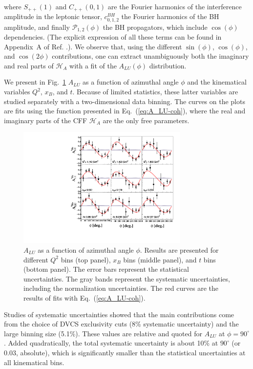 \documentclass[twocolumn,nofootinbib,prl,superscriptaddress,secnumarabic,amssymb,nobibnotes,aps,floatfix]{revtex4}
\begin{document}
where $S_{++}(1)$ and $C_{++}(0,1)$ are the Fourier harmonics of the 
interference amplitude in the leptonic tensor, $c_{0,1,2}^{BH}$ the Fourier 
harmonics of the BH amplitude, and finally ${\mathcal P}_{1,2}(\phi)$ the BH
propagators, which include $\cos(\phi)$ dependencies. (The explicit expression 
of all these terms can be found in Appendix~A of Ref.  
\cite{Armstrong:2017wfw}.). We observe that, using the different $\sin(\phi)$, 
$\cos(\phi)$, and $\cos(2\phi)$ contributions, one can extract unambiguously 
both the imaginary and real parts of $\mathcal{H}_{A}$ with a fit of the 
$A_{LU}(\phi)$ distribution.

We present in Fig.~\ref{fig:alu} $A_{LU}$ as a function of azimuthal angle 
$\phi$ and the kinematical variables $Q^2$, $x_B$, and $t$. Because of limited 
statistics, these latter variables are studied separately with a 
two-dimensional data binning. The curves on the plots are fits using the 
function presented in Eq.~(\ref{eq:A_LU-coh}), where the real and imaginary 
parts of the CFF $\mathcal{H}_{A}$ are the only free parameters. 

\begin{figure}[tb]
   \centering
\includegraphics[width=8.5cm]{F_Coherent_ALU_phi.pdf}
\caption{$A_{LU}$ as a function of azimuthal angle $\phi$. Results are presented
   for different $Q^{2}$ bins (top panel), $x_{B}$ bins (middle panel), and $t$ 
   bins (bottom panel).  The error bars represent the statistical 
uncertainties. The gray bands represent the systematic uncertainties, including 
the normalization uncertainties. The red curves are the results of fits with 
Eq.~(\ref{eq:A_LU-coh}).}
\label{fig:alu}
\end{figure}

Studies of systematic uncertainties showed that the main contributions 
come from the choice of DVCS exclusivity cuts (8\% systematic uncertainty) and the 
large binning size (5.1\%). These values are relative and quoted for $A_{LU}$
at $\phi=90^\circ$. Added quadratically, the total systematic uncertainty
is about 10\% at $90^\circ$ (or 0.03, absolute), which is significantly smaller
than the statistical uncertainties at all kinematical bins. 
\end{document}
